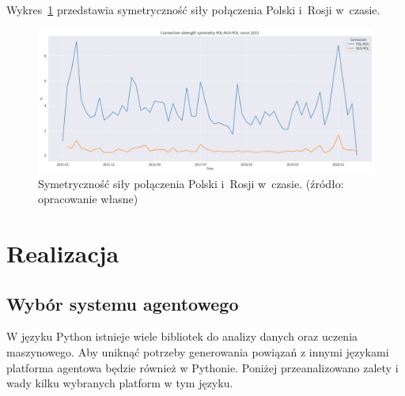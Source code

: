 \documentclass[11pt]{report}
\begin{document}
    Wykres~\ref{fig:POL-RUS-POL} przedstawia symetryczność siły połączenia Polski i~Rosji w~czasie.
    \begin{figure}[!htp]
        \centering
        \includegraphics[width=\linewidth]{fig/POL-RUS-POL.png}
        \caption{Symetryczność siły połączenia Polski i~Rosji w~czasie. (źródło: opracowanie własne)}
        \label{fig:POL-RUS-POL}
    \end{figure}


    \chapter{Realizacja}\label{ch:realizacja}


    \section{Wybór systemu agentowego}

    W języku Python istnieje wiele bibliotek do analizy danych oraz uczenia maszynowego.
    Aby uniknąć potrzeby generowania powiązań z innymi językami platforma agentowa będzie również w Pythonie.
    Poniżej przeanalizowano zalety i wady kilku wybranych platform w tym języku.
\end{document}
